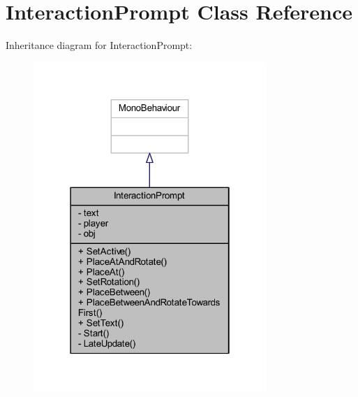 \hypertarget{class_interaction_prompt}{}\section{Interaction\+Prompt Class Reference}
\label{class_interaction_prompt}


Inheritance diagram for Interaction\+Prompt\+:\nopagebreak
\begin{figure}[H]
\begin{center}
\leavevmode
\includegraphics[width=250pt]{class_interaction_prompt__inherit__graph}
\end{center}
\end{figure}


